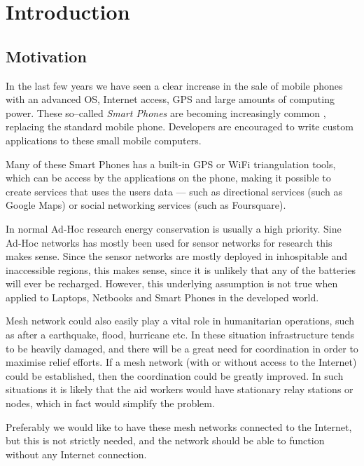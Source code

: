 \section{Introduction}
\label{section:introduction} 

\subsection{Motivation}
In the last few years we have seen a clear increase in the sale of mobile phones with an advanced OS, Internet access, GPS and large amounts of computing power. These so--called \emph{Smart Phones} are becoming increasingly common , replacing the standard mobile phone. Developers are encouraged to write custom applications to these small mobile computers.

Many of these Smart Phones has a built-in GPS or WiFi triangulation tools, which can be access by the applications on the phone, making it possible to create services that uses the users data --- such as directional services (such as Google Maps) or social networking services (such as Foursquare).

In normal Ad-Hoc research energy conservation is usually a high priority. Sine Ad-Hoc networks has mostly been used for sensor networks for research this makes sense. Since the sensor networks are mostly deployed in inhospitable and inaccessible regions, this makes sense, since it is unlikely that any of the batteries will ever be recharged. However, this underlying assumption is not true when applied to Laptops, Netbooks and Smart Phones in the developed world. 

Mesh network could also easily play a vital role in humanitarian operations, such as after a earthquake, flood, hurricane etc. In these situation infrastructure tends to be heavily damaged, and there will be a great need for coordination in order to maximise relief efforts. If a mesh network (with or without access to the Internet) could be established, then the coordination could be greatly improved. In such situations it is likely that the aid workers would have stationary relay stations or nodes, which in fact would simplify the problem.

Preferably we would like to have these mesh networks connected to the Internet, but this is not strictly needed, and the network should be able to function without any Internet connection.
 

